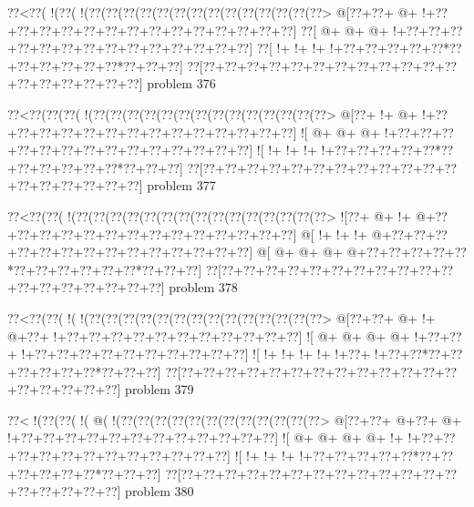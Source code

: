 \vbox{\vbox{\goo
\0??<\0??(\- !(\0??(\- !(\0??(\0??(\0??(\0??(\0??(\0??(\0??(\0??(\0??(\0??(\0??(\0??(\0??(\0??>
\- @[\0??+\0??+\- @+\- !+\0??+\0??+\0??+\0??+\0??+\0??+\0??+\0??+\0??+\0??+\0??+\0??+\0??+\0??]
\0??[\- @+\- @+\- @+\- !+\0??+\0??+\0??+\0??+\0??+\0??+\0??+\0??+\0??+\0??+\0??+\0??+\0??+\0??]
\0??[\- !+\- !+\- !+\- !+\0??+\0??+\0??+\0??+\0??*\0??+\0??+\0??+\0??+\0??+\0??*\0??+\0??+\0??]
\0??[\0??+\0??+\0??+\0??+\0??+\0??+\0??+\0??+\0??+\0??+\0??+\0??+\0??+\0??+\0??+\0??+\0??+\0??]
}
\hfil problem 376\hfil\break
}



\vbox{\vbox{\goo
\0??<\0??(\0??(\0??(\- !(\0??(\0??(\0??(\0??(\0??(\0??(\0??(\0??(\0??(\0??(\0??(\0??(\0??(\0??>
\- @[\0??+\- !+\- @+\- !+\0??+\0??+\0??+\0??+\0??+\0??+\0??+\0??+\0??+\0??+\0??+\0??+\0??+\0??]
\- ![\- @+\- @+\- @+\- !+\0??+\0??+\0??+\0??+\0??+\0??+\0??+\0??+\0??+\0??+\0??+\0??+\0??+\0??]
\- ![\- !+\- !+\- !+\- !+\0??+\0??+\0??+\0??+\0??*\0??+\0??+\0??+\0??+\0??+\0??*\0??+\0??+\0??]
\0??[\0??+\0??+\0??+\0??+\0??+\0??+\0??+\0??+\0??+\0??+\0??+\0??+\0??+\0??+\0??+\0??+\0??+\0??]
}
\hfil problem 377\hfil\break
}



\vbox{\vbox{\goo
\0??<\0??(\0??(\- !(\0??(\0??(\0??(\0??(\0??(\0??(\0??(\0??(\0??(\0??(\0??(\0??(\0??(\0??(\0??>
\- ![\0??+\- @+\- !+\- @+\0??+\0??+\0??+\0??+\0??+\0??+\0??+\0??+\0??+\0??+\0??+\0??+\0??+\0??]
\- @[\- !+\- !+\- !+\- @+\0??+\0??+\0??+\0??+\0??+\0??+\0??+\0??+\0??+\0??+\0??+\0??+\0??+\0??]
\- @[\- @+\- @+\- @+\- @+\0??+\0??+\0??+\0??+\0??*\0??+\0??+\0??+\0??+\0??+\0??*\0??+\0??+\0??]
\0??[\0??+\0??+\0??+\0??+\0??+\0??+\0??+\0??+\0??+\0??+\0??+\0??+\0??+\0??+\0??+\0??+\0??+\0??]
}
\hfil problem 378\hfil\break
}



\vbox{\vbox{\goo
\0??<\0??(\0??(\- !(\- !(\0??(\0??(\0??(\0??(\0??(\0??(\0??(\0??(\0??(\0??(\0??(\0??(\0??(\0??>
\- @[\0??+\0??+\- @+\- !+\- @+\0??+\- !+\0??+\0??+\0??+\0??+\0??+\0??+\0??+\0??+\0??+\0??+\0??]
\- ![\- @+\- @+\- @+\- @+\- !+\0??+\0??+\- !+\0??+\0??+\0??+\0??+\0??+\0??+\0??+\0??+\0??+\0??]
\- ![\- !+\- !+\- !+\- !+\- !+\0??+\- !+\0??+\0??*\0??+\0??+\0??+\0??+\0??+\0??*\0??+\0??+\0??]
\0??[\0??+\0??+\0??+\0??+\0??+\0??+\0??+\0??+\0??+\0??+\0??+\0??+\0??+\0??+\0??+\0??+\0??+\0??]
}
\hfil problem 379\hfil\break
}



\vbox{\vbox{\goo
\0??<\- !(\0??(\0??(\- !(\- @(\- !(\0??(\0??(\0??(\0??(\0??(\0??(\0??(\0??(\0??(\0??(\0??(\0??>
\- @[\0??+\0??+\- @+\0??+\- @+\- !+\0??+\0??+\0??+\0??+\0??+\0??+\0??+\0??+\0??+\0??+\0??+\0??]
\- ![\- @+\- @+\- @+\- @+\- !+\- !+\0??+\0??+\0??+\0??+\0??+\0??+\0??+\0??+\0??+\0??+\0??+\0??]
\- ![\- !+\- !+\- !+\- !+\0??+\0??+\0??+\0??+\0??*\0??+\0??+\0??+\0??+\0??+\0??*\0??+\0??+\0??]
\0??[\0??+\0??+\0??+\0??+\0??+\0??+\0??+\0??+\0??+\0??+\0??+\0??+\0??+\0??+\0??+\0??+\0??+\0??]
}
\hfil problem 380\hfil\break
}



